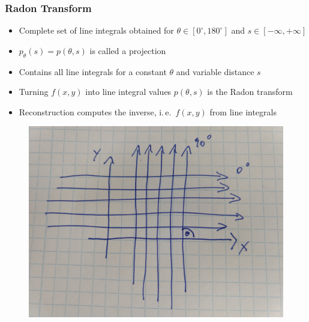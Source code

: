 \begin{frame}
	\frametitle{Radon Transform}

	\begin{itemize}
		\setlength\itemsep{0.3cm}
		\item Complete set of line integrals obtained for $\theta \in [0^\circ, 180^\circ]$ and $s \in [-\infty, +\infty]$
		\item $p_{\theta}(s) = p(\theta,s)$ is called a projection
		\item Contains all line integrals for a constant $\theta$ and variable distance $s$
		\item Turning $f(x,y)$ into line integral values $p(\theta, s)$ is the Radon transform
		\item Reconstruction computes the inverse, i.\,e.~$f(x,y)$ from line integrals
	\end{itemize}

	\begin{figure}[tbp]
		\centering
		\includegraphics[height=0.4\textheight]{images/radon2_rotation}%
		\label{fig:ct_radon2_rotation}
	\end{figure}
	
\end{frame}

